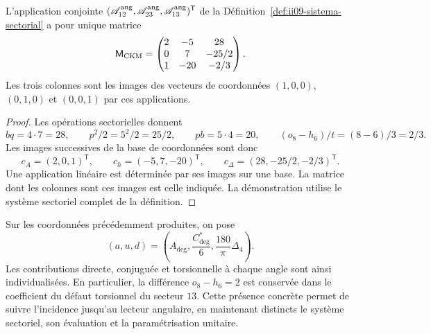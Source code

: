 \begin{theorem}
\label{thm:ii09-matriz-sectorial}
L'application conjointe
\((\mathscr A_{12}^{\rm ang},\mathscr A_{23}^{\rm ang},
\mathscr A_{13}^{\rm ang})^{\mathsf T}\) de la
Définition~\ref{def:ii09-sistema-sectorial} a pour unique matrice
\[
 \mathsf M_{\rm CKM}=
 \begin{pmatrix}
 2&-5&28\\
 0&7&-25/2\\
 1&-20&-2/3
 \end{pmatrix}.
\]
Les trois colonnes sont les images des vecteurs de coordonnées
\((1,0,0)\), \((0,1,0)\) et \((0,0,1)\) par ces applications.
\end{theorem}
\begin{proof}
Les opérations sectorielles donnent
\[
 bq=4\cdot7=28,\qquad p^2/2=5^2/2=25/2,
 \qquad pb=5\cdot4=20,\qquad
 (o_8-h_6)/t=(8-6)/3=2/3.
\]
Les images successives de la base de coordonnées sont donc
\[
 c_A=(2,0,1)^{\mathsf T},\qquad
 c_h=(-5,7,-20)^{\mathsf T},\qquad
 c_\Delta=(28,-25/2,-2/3)^{\mathsf T}.
\]
Une application linéaire est déterminée par ses images sur une
base. La matrice dont les colonnes sont ces images est celle indiquée.
La démonstration utilise le système sectoriel complet de la définition.
\end{proof}

Sur les coordonnées précédemment produites, on pose
\[
 (a,u,d)=\left(A_{\deg},\frac{C^*_{\deg}}6,
                       \frac{180}{\pi}\Delta_4\right).
\]
Les contributions directe, conjuguée et torsionnelle à chaque angle
sont ainsi individualisées. En particulier, la différence
\(o_8-h_6=2\) est conservée dans le coefficient du défaut torsionnel
du secteur \(13\). Cette présence concrète permet de suivre
l'incidence jusqu'au lecteur angulaire, en maintenant distincts le
système sectoriel, son évaluation et la paramétrisation unitaire.
